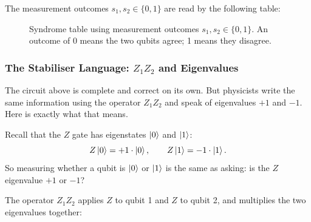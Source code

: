 \documentclass[11pt, a4paper]{article}
\theoremstyle{definition}
\theoremstyle{plain}
\theoremstyle{remark}
\begin{document}
The measurement outcomes $s_1, s_2 \in \{0, 1\}$ are read by the
following table:

\begin{figure}[H]
\centering
{}
\caption{Syndrome table using measurement outcomes $s_1, s_2 \in \{0,1\}$.
An outcome of 0 means the two qubits agree; 1 means they disagree.}
\label{tab:3qubit-syndrome-01}
\end{figure}

\subsubsection{The Stabiliser Language: $Z_1Z_2$ and Eigenvalues}

The circuit above is complete and correct on its own.
But physicists write the same information using the operator $Z_1Z_2$
and speak of eigenvalues $+1$ and $-1$.
Here is exactly what that means.

Recall that the $Z$ gate has eigenstates $\ket{0}$ and $\ket{1}$:
\[
  Z\ket{0} = +1\cdot\ket{0}, \qquad Z\ket{1} = -1\cdot\ket{1}.
\]
So measuring whether a qubit is $\ket{0}$ or $\ket{1}$ is the same as
asking: is the $Z$ eigenvalue $+1$ or $-1$?

The operator $Z_1Z_2$ applies $Z$ to qubit 1 and $Z$ to qubit 2, and
multiplies the two eigenvalues together:
\end{document}
